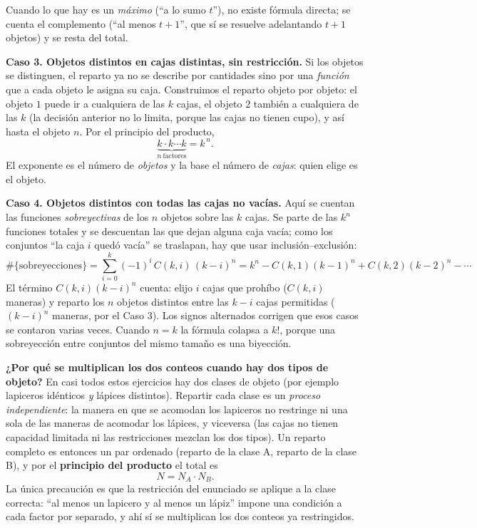 \documentclass[11pt]{article}
\begin{document}
\begin{teo}
Cuando lo que hay es un \emph{máximo} (``a lo sumo $t$''), no existe fórmula directa; se cuenta el complemento (``al menos $t+1$'', que sí se resuelve adelantando $t+1$ objetos) y se resta del total.

\medskip
\textbf{Caso 3. Objetos distintos en cajas distintas, sin restricción.}
Si los objetos se distinguen, el reparto ya no se describe por cantidades sino por una \emph{función} que a cada objeto le asigna su caja. Construimos el reparto objeto por objeto: el objeto $1$ puede ir a cualquiera de las $k$ cajas, el objeto $2$ también a cualquiera de las $k$ (la decisión anterior no lo limita, porque las cajas no tienen cupo), y así hasta el objeto $n$. Por el principio del producto,
\[
\underbrace{k\cdot k\cdots k}_{n\ \text{factores}}=k^{\,n}.
\]
El exponente es el número de \emph{objetos} y la base el número de \emph{cajas}: quien elige es el objeto.

\medskip
\textbf{Caso 4. Objetos distintos con todas las cajas no vacías.}
Aquí se cuentan las funciones \emph{sobreyectivas} de los $n$ objetos sobre las $k$ cajas. Se parte de las $k^n$ funciones totales y se descuentan las que dejan alguna caja vacía; como los conjuntos ``la caja $i$ quedó vacía'' se traslapan, hay que usar inclusión--exclusión:
\[
\#\{\text{sobreyecciones}\}=\sum_{i=0}^{k}(-1)^i\,C(k,i)\,(k-i)^n
=k^n-C(k,1)(k-1)^n+C(k,2)(k-2)^n-\cdots
\]
El término $C(k,i)(k-i)^n$ cuenta: elijo $i$ cajas que prohíbo ($C(k,i)$ maneras) y reparto los $n$ objetos distintos entre las $k-i$ cajas permitidas ($(k-i)^n$ maneras, por el Caso 3). Los signos alternados corrigen que esos casos se contaron varias veces. Cuando $n=k$ la fórmula colapsa a $k!$, porque una sobreyección entre conjuntos del mismo tamaño es una biyección.

\medskip
\textbf{¿Por qué se multiplican los dos conteos cuando hay dos tipos de objeto?}
En casi todos estos ejercicios hay dos clases de objeto (por ejemplo lapiceros idénticos \emph{y} lápices distintos). Repartir cada clase es un \emph{proceso independiente}: la manera en que se acomodan los lapiceros no restringe ni una sola de las maneras de acomodar los lápices, y viceversa (las cajas no tienen capacidad limitada ni las restricciones mezclan los dos tipos). Un reparto completo es entonces un par ordenado (reparto de la clase A, reparto de la clase B), y por el \textbf{principio del producto} el total es
\[
N=N_A\cdot N_B .
\]
La única precaución es que la restricción del enunciado se aplique a la clase correcta: ``al menos un lapicero y al menos un lápiz'' impone una condición a cada factor por separado, y ahí sí se multiplican los dos conteos ya restringidos.
\end{teo}
\end{document}
